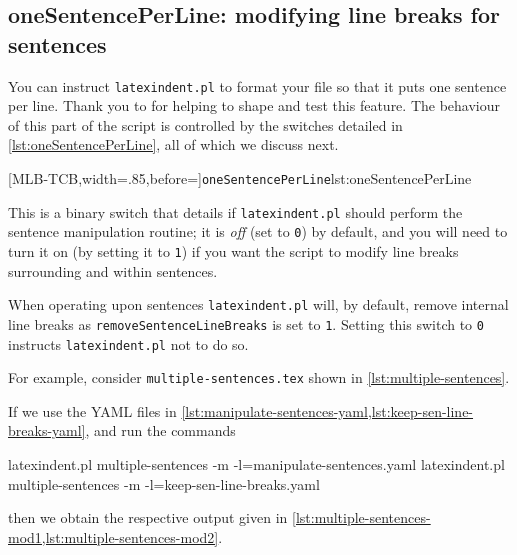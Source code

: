 \subsection{oneSentencePerLine: modifying line breaks for sentences}\label{sec:onesentenceperline}

 You can instruct \texttt{latexindent.pl} to format  your file so that it puts one sentence per line. Thank you to \cite{mlep} for
 helping to shape and test this feature. The behaviour of this part of the script is
 controlled by the switches detailed in \cref{lst:oneSentencePerLine}, all of which we
 discuss next. 
  

 [MLB-TCB,width=.85\linewidth,before=\centering]{\texttt{oneSentencePerLine}}{lst:oneSentencePerLine}

 This is a binary switch that details if \texttt{latexindent.pl} should perform the
 sentence manipulation routine; it is \emph{off} (set to \texttt{0}) by default, and you
 will need to turn it on (by setting it to \texttt{1}) if you want the script to modify
 line breaks surrounding and within sentences.

 When operating upon sentences \texttt{latexindent.pl} will, by default, remove internal
 line breaks as \texttt{removeSentenceLineBreaks} is set to \texttt{1}. Setting this
 switch to \texttt{0} instructs \texttt{latexindent.pl} not to do so.

 For example, consider \texttt{multiple-sentences.tex} shown in
 \cref{lst:multiple-sentences}.


 If we use the YAML files in
 \cref{lst:manipulate-sentences-yaml,lst:keep-sen-line-breaks-yaml}, and run the commands
  
 \begin{widepage}
  \begin{commandshell}
latexindent.pl multiple-sentences -m -l=manipulate-sentences.yaml
latexindent.pl multiple-sentences -m -l=keep-sen-line-breaks.yaml
\end{commandshell}
 \end{widepage}
 then we obtain the respective output given in
 \cref{lst:multiple-sentences-mod1,lst:multiple-sentences-mod2}.

